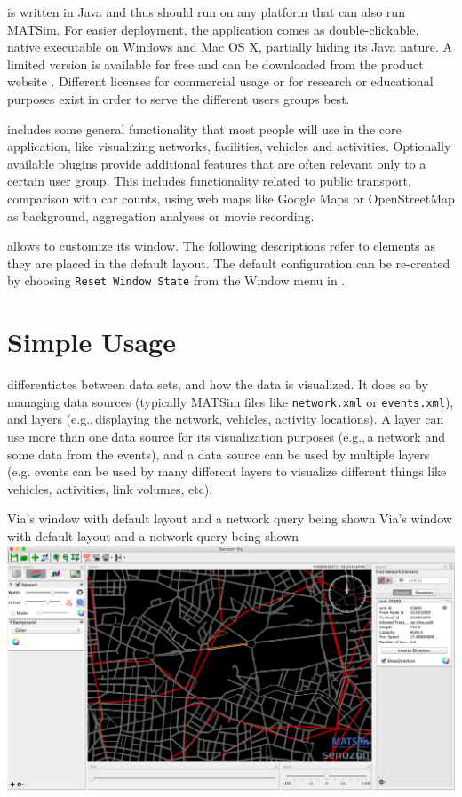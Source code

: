 \Via{} is written in Java and thus should run on any platform that can also run
MATSim. For easier deployment, the application comes as double-clickable, native
executable on Windows and Mac OS X, partially hiding its Java nature. A
limited version is available for free and can be downloaded from the product
website \citep[][]{senozonVIA_Webpage_2015}. 
Different licenses for commercial usage or for research or educational purposes
exist in order to serve the different users groups best.

\Via{} includes some general functionality that most people will use in the core
application, like visualizing networks, facilities, vehicles and activities.
Optionally available plugins provide additional features that are
often relevant only to a certain user group. This includes functionality related
to public transport, comparison with car counts, using web maps like Google Maps
or OpenStreetMap as background, aggregation analyses or movie recording.

\Via{} allows to customize its window. The following descriptions refer to
elements as they are placed in the default layout. The default configuration can
be re-created by choosing \lstinline|Reset Window State| from the Window menu in \Via{}.

\section{Simple Usage}
\Via{} differentiates between data sets, and how the data is visualized. It
does so by managing data sources (typically MATSim files like \lstinline|network.xml|
or \lstinline|events.xml|), and layers (e.g.,\,displaying the network, vehicles,
activity locations). A layer can use more than one data source for its
visualization purposes (e.g.,\,a network and some data from the events), and a
data source can be used by multiple layers (e.g. events can be used by many
different layers to visualize different things like vehicles, activities, link
volumes, etc).

\createfigure%
{Via's window with default layout and a network query being shown}%
{Via's window with default layout and a network query being shown}%
{\label{fig:via:window}}%
{\includegraphics[width=1.\textwidth,angle=0]{./extending/figures/via/window.png}}%
{}

